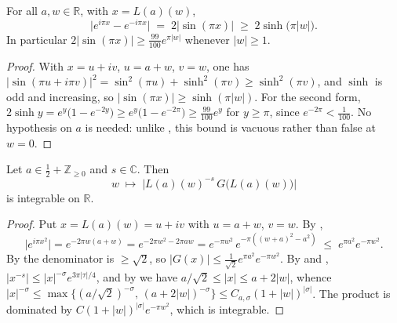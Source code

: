 \begin{lemma}
\label{lem:rs_sin_lower_sharp}
\leanok
{}
For all $a,w\in\mathbb{R}$, with $x=L(a)(w)$,
\[
  \bigl|e^{i\pi x}-e^{-i\pi x}\bigr|\;=\;2\lvert\sin(\pi x)\rvert\;\ge\;2\sinh\bigl(\pi\lvert w\rvert\bigr).
\]
In particular $2\lvert\sin(\pi x)\rvert\ge\tfrac{99}{100}e^{\pi\lvert w\rvert}$ whenever
$\lvert w\rvert\ge1$.
\end{lemma}

\begin{proof}
\leanok
{}
With $x=u+iv$, $u=a+w$, $v=w$, one has
$\lvert\sin(\pi u+i\pi v)\rvert^{2}=\sin^{2}(\pi u)+\sinh^{2}(\pi v)\ge\sinh^{2}(\pi v)$, and
$\sinh$ is odd and increasing, so $\lvert\sin(\pi x)\rvert\ge\sinh(\pi\lvert w\rvert)$.  For the
second form, $2\sinh y=e^{y}\bigl(1-e^{-2y}\bigr)\ge e^{y}\bigl(1-e^{-2\pi}\bigr)
\ge\tfrac{99}{100}e^{y}$ for $y\ge\pi$, since $e^{-2\pi}<\tfrac1{100}$.  No hypothesis on $a$ is
needed: unlike , this bound is vacuous rather than false at $w=0$.
\end{proof}

\begin{proposition}
\label{prop:rs_integrable}
\leanok
{}
Let $a\in\tfrac12+\mathbb{Z}_{\ge0}$ and $s\in\mathbb{C}$.  Then
\[
  w\;\longmapsto\;\bigl|L(a)(w)^{-s}\,G\bigl(L(a)(w)\bigr)\bigr|
\]
is integrable on $\mathbb{R}$.
\end{proposition}

\begin{proof}
\leanok
Put $x=L(a)(w)=u+iv$ with $u=a+w$, $v=w$.  By ,
\[
  \bigl|e^{i\pi x^{2}}\bigr|=e^{-2\pi w(a+w)}=e^{-2\pi w^{2}-2\pi aw}
  =e^{-\pi w^{2}}\,e^{-\pi((w+a)^{2}-a^{2})}\;\le\;e^{\pi a^{2}}e^{-\pi w^{2}} .
\]
By  the denominator is $\ge\sqrt2$, so
$\lvert G(x)\rvert\le \tfrac1{\sqrt2}e^{\pi a^{2}}e^{-\pi w^{2}}$.  By
 and ,
$\lvert x^{-s}\rvert\le\lvert x\rvert^{-\sigma}e^{3\pi\lvert\tau\rvert/4}$, and by
 we have $a/\sqrt2\le\lvert x\rvert\le a+2\lvert w\rvert$, whence
$\lvert x\rvert^{-\sigma}\le\max\bigl\{(a/\sqrt2)^{-\sigma},\,(a+2|w|)^{-\sigma}\bigr\}
\le C_{a,\sigma}(1+|w|)^{\lvert\sigma\rvert}$.  The product is dominated by
$C(1+|w|)^{|\sigma|}e^{-\pi w^{2}}$, which is integrable.
\end{proof}

